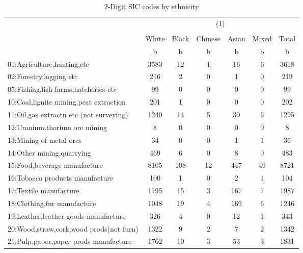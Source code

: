 {
\def\sym#1{\ifmmode^{#1}\else\(^{#1}\)\fi}
\begin{longtable}{l*{6}{c}}
\caption{2-Digit SIC codes by ethnicity}\\
\hline\hline\endfirsthead\hline\endhead\hline\endfoot\endlastfoot
          &\multicolumn{6}{c}{(1)}                                    \\
          &\multicolumn{6}{c}{}                                       \\
          &    White&    Black&  Chinese&    Asian&    Mixed&    Total\\
          &        b&        b&        b&        b&        b&        b\\
\hline
01:Agriculture,hunting,etc&     3583&       12&        1&       16&        6&     3618\\
02:Forestry,logging etc&      216&        2&        0&        1&        0&      219\\
05:Fishing,fish farms,hatcheries etc&       99&        0&        0&        0&        0&       99\\
10:Coal,lignite mining,peat extraction&      201&        1&        0&        0&        0&      202\\
11:Oil,gas extractn etc (not surveying)&     1240&       14&        5&       30&        6&     1295\\
12:Uranium,thorium ore mining&        8&        0&        0&        0&        0&        8\\
13:Mining of metal ores&       34&        0&        0&        1&        1&       36\\
14:Other mining,quarrying&      469&        6&        0&        8&        0&      483\\
15:Food,beverage manufacture&     8105&      108&       12&      447&       49&     8721\\
16:Tobacco products manufacture&      100&        1&        0&        2&        1&      104\\
17:Textile manufacture&     1795&       15&        3&      167&        7&     1987\\
18:Clothing,fur manufacture&     1048&       19&        4&      169&        6&     1246\\
19:Leather,leather goods manufacture&      326&        4&        0&       12&        1&      343\\
20:Wood,straw,cork,wood prods(not furn)&     1322&        9&        2&        7&        2&     1342\\
21:Pulp,paper,paper prods manufacture&     1762&       10&        3&       53&        3&     1831\\

\end{longtable}}
